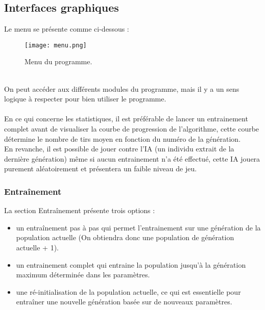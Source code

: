 \documentclass[12pt]{report}
\begin{document}
	\subsection{Interfaces graphiques}
	Le menu se présente comme ci-dessous :
	\begin{figure}[h]
    	\begin{center}
		\texttt{[image: menu.png]}
		\caption{Menu du programme.}
		\end{center}
	\end{figure}
	\\On peut accéder aux différents modules du programme, mais il y a un sens logique à respecter pour bien utiliser le programme.\\\\
	En ce qui concerne les statistiques, il est préférable de lancer un entrainement complet avant de visualiser la courbe de progression de l'algorithme, cette courbe détermine le nombre de tirs moyen en fonction du numéro de la génération.\\
	En revanche, il est possible de jouer contre l'IA (un individu extrait de la dernière génération) même si aucun entrainement n'a été effectué, cette IA jouera purement aléatoirement et présentera un faible niveau de jeu.
	\subsubsection{Entraînement}
	La section Entraînement présente trois options :
	\begin{itemize}
		\item un entraînement pas à pas qui permet l'entrainement sur une génération de la population actuelle (On obtiendra donc une population de génération\\actuelle + 1).
		\item un entrainement complet qui entraine la population jusqu'à la génération\\maximum déterminée dans les paramètres.
		\item une ré-initialisation de la population actuelle, ce qui est essentielle pour\\entraîner une nouvelle génération basée sur de nouveaux paramètres.
	\end{itemize}
	\newpage
\end{document}
